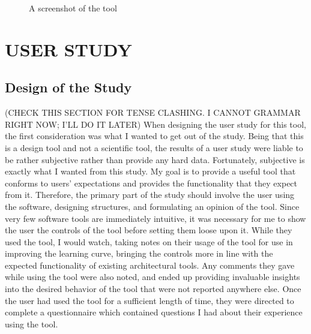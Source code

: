 \documentclass{thesis}
\begin{document}
\begin{figure}
\caption{A screenshot of the tool}
\label{fig:waist}
\end{figure}


\chapter{USER STUDY}
\section{Design of the Study}
(CHECK THIS SECTION FOR TENSE CLASHING.  I CANNOT GRAMMAR RIGHT NOW; I'LL DO IT LATER)
When designing the user study for this tool, the first consideration was what I wanted to get out of the study.  Being that this is
a design tool and not a scientific tool, the results of a user study were liable to be rather subjective rather than provide any hard
data.  Fortunately, subjective is exactly what I wanted from this study.  My goal is to provide a useful tool that conforms to users'
expectations and provides the functionality that they expect from it.  Therefore, the primary part of the study should involve the
user using the software, designing structures, and formulating an opinion of the tool.  Since very few software tools are immediately
intuitive, it was necessary for me to show the user the controls of the tool before setting them loose upon it.  While they used
the tool, I would watch, taking notes on their usage of the tool for use in improving the learning curve, bringing the controls
more in line with the expected functionality of existing architectural tools.  Any comments they gave while using the tool were also
noted, and ended up providing invaluable insights into the desired behavior of the tool that were not reported anywhere else.  Once
the user had used the tool for a sufficient length of time, they were directed to complete a questionnaire which contained questions
I had about their experience using the tool.
\end{document}
